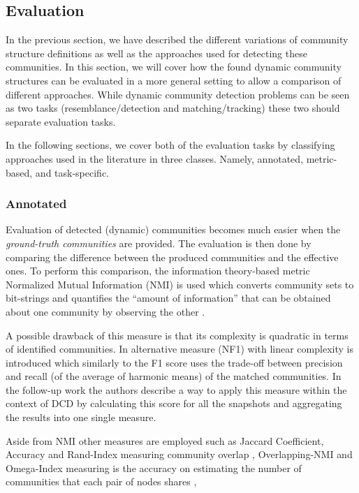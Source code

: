 \documentclass[
acmsmall,
nonacm,
screen,
acmthm]{../../scripts/pandoc/templates/acmart}
\begin{document}
\hypertarget{evaluation}{%
\subsection{Evaluation}\label{evaluation}}

In the previous section, we have described the different variations of
community structure definitions as well as the approaches used for
detecting these communities. In this section, we will cover how the
found dynamic community structures can be evaluated in a more general
setting to allow a comparison of different approaches. While dynamic
community detection problems can be seen as two tasks
(resemblance/detection and matching/tracking) these two should separate
evaluation tasks.

In the following sections, we cover both of the evaluation tasks by
classifying approaches used in the literature in three classes. Namely,
annotated, metric-based, and task-specific.

\hypertarget{annotated}{%
\subsubsection{Annotated}\label{annotated}}

Evaluation of detected (dynamic) communities becomes much easier when
the \emph{ground-truth communities} are provided. The evaluation is then
done by comparing the difference between the produced communities and
the effective ones. To perform this comparison, the information
theory-based metric Normalized Mutual Information (NMI) is used which
converts community sets to bit-strings and quantifies the ``amount of
information'' that can be obtained about one community by observing the
other \citep{lancichinettiDetectingOverlappingHierarchical2009}.

A possible drawback of this measure is that its complexity is quadratic
in terms of identified communities. In
\citep{rossettiNovelApproachEvaluate2016} alternative measure (NF1) with
linear complexity is introduced which similarly to the F1 score uses the
trade-off between precision and recall (of the average of harmonic
means) of the matched communities. In the follow-up work
\citep{rossettiANGELEfficientEffective2020} the authors describe a way
to apply this measure within the context of DCD by calculating this
score for all the snapshots and aggregating the results into one single
measure.

Aside from NMI other measures are employed such as Jaccard Coefficient,
Accuracy and Rand-Index measuring community overlap
\citep{yangGraphClusteringDynamic2017, mrabahRethinkingGraphAutoEncoder2021, luoDetectingCommunitiesHeterogeneous2021},
Overlapping-NMI \citep{yeDeepAutoencoderlikeNonnegative2018} and
Omega-Index measuring is the accuracy on estimating the number of
communities that each pair of nodes shares
\citep{yangCommunityAffiliationGraphModel2012},
\end{document}
